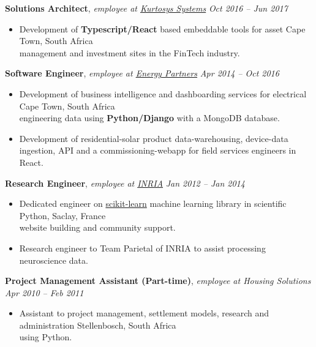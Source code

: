 \documentclass[9pt]{extarticle}
\begin{document}
\noindent
{\bf Solutions Architect}, \textit{employee at \href{https://www.kurtosys.com/}{Kurtosys Systems}}  \hfill \textit{Oct 2016 -- Jun 2017}
\begin{itemize}
\setlength\itemsep{0.05em}
\item Development of \textbf{Typescript/React} based embeddable tools for asset \hfill Cape Town, South Africa \\
management and investment sites in the FinTech industry.
\end{itemize}

\noindent
{\bf Software Engineer}, \textit{employee at \href{https://energypartners.co.za/}{Energy Partners}}  \hfill \textit{Apr 2014 -- Oct 2016}
\begin{itemize}
\setlength\itemsep{0.05em}
\item Development of business intelligence and dashboarding services for electrical \hfill Cape Town, South Africa \\
engineering data using \textbf{Python/Django} with a MongoDB database.
\item Development of residential-solar product data-warehousing, device-data \\
ingestion, API and a commissioning-webapp for field services engineers in React.

\end{itemize}

\noindent
{\bf Research Engineer}, \textit{employee at \href{https://www.inria.fr/en}{INRIA}}  \hfill \textit{Jan 2012 -- Jan 2014}
\begin{itemize}
\setlength\itemsep{0.05em}

\item Dedicated engineer on \href{https://scikit-learn.org/stable/}{scikit-learn} machine learning library in scientific Python, \hfill Saclay, France \\
website building and community support.
\item Research engineer to Team Parietal of INRIA to assist processing neuroscience data.

\end{itemize}

\noindent
{\bf Project Management Assistant (Part-time)}, \textit{employee at Housing Solutions}  \hfill \textit{Apr 2010 -- Feb 2011}
\begin{itemize}
\setlength\itemsep{0.05em}
\item Assistant to project management, settlement models, research and administration \hfill Stellenbosch, South Africa \\
using Python.

\end{itemize}
\end{document}
